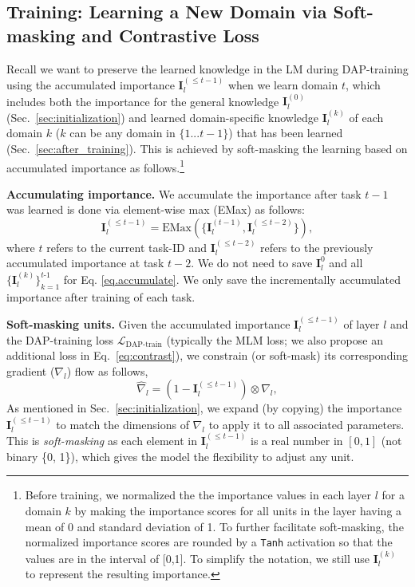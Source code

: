 \documentclass{article} \usepackage{iclr2023_conference,times}
\begin{document}
\subsection{Training: Learning a New Domain via Soft-masking and Contrastive Loss}
\label{sec:training}



Recall we want to preserve the learned knowledge in the LM during DAP-training using the accumulated importance $\bm{I}_{l}^{(\le t-1)}$ when we learn domain $t$, which includes both the importance for the general knowledge $\bm{I}_l^{(0)}$ (Sec.~\ref{sec:initialization}) and learned domain-specific knowledge $\bm{I}_l^{(k)}$ of each domain $k$ ($k$ can be any domain in $\{1...t-1\}$) that has been learned (Sec.~\ref{sec:after_training}). This is achieved by soft-masking the learning based on accumulated importance as follows.\footnote{{\color{black}Before training, we normalized the the importance values in each layer $l$ for a domain $k$ by making the importance scores for all units in the layer having a mean of 0 and standard deviation of 1. To further facilitate soft-masking, the normalized importance scores are rounded by a \texttt{Tanh} activation so that the values are in the interval of [0,1]. To simplify the notation, we still use $\bm{I}^{(k)}_{l}$ to represent the resulting importance.}}

\textbf{Accumulating importance.} We accumulate the importance after task $t-1$ was learned is done {\color{black}via element-wise max (EMax)} as follows: 
\begin{equation}
\bm{I}_{l}^{(\le t-1)} = \text{EMax}(\{\bm{I}_{l}^{(t-1)},\bm{I}^{(\le t-2)}_{l}\}),
\label{eq.accumulate}
\end{equation}
where $t$ refers to the current task-ID and $\bm{I}^{(\le t-2)}_{l}$ refers to the previously accumulated importance at task $t-2$. 
We do not need to save $\bm{I}_{l}^{0}$ and all $\{\bm{I}^{(k)}_{l}\}_{k=1}^{t\text{-1}}$ for Eq. \ref{eq.accumulate}. We only save the incrementally accumulated importance after training of each task. 

\textbf{Soft-masking units.} Given the accumulated importance $\bm{I}_{l}^{(\le t-1)}$ of layer $l$ and the DAP-training loss $\mathcal{L}_{\text{DAP-train}}$ (typically the MLM loss; we also propose an additional loss in Eq.~\ref{eq:contrast}), we constrain (or soft-mask) its corresponding gradient ($\nabla_l$) flow as follows, \begin{equation}
\label{eq.softmask}
\hat{\nabla}_{l} = (1-\bm{I}_{l}^{(\le t-1)}) \otimes \nabla_{l},
\end{equation}
As mentioned in Sec.~\ref{sec:initialization}, we expand (by copying) the importance $\bm{I}_{l}^{(\le t-1)}$ to match the dimensions of $\nabla_l$ to apply it to all associated parameters. This is \textit{soft-masking} as each element in $\bm{I}_{l}^{(\le t-1)}$ is a real number in $[0,1]$ (not binary \{0, 1\}), which gives the model the flexibility to adjust any unit. 
\end{document}
